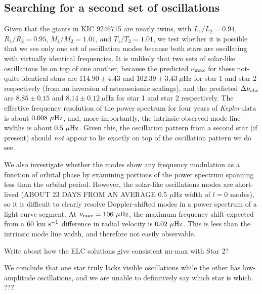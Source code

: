 \subsection{Searching for a second set of oscillations}

Given that the giants in KIC 9246715 are nearly twins, with $L_1/L_2 = 0.94$, $R_1/R_2 = 0.95$, $M_1/M_2 = 1.01$, and $T_1/T_2 = 1.01$, we test whether it is possible that we see only one set of oscillation modes because both stars are oscillating with virtually identical frequencies. It is unlikely that two sets of solar-like oscillations lie on top of one another, because the predicted $\nu_{\rm{max}}$ for these not-quite-identical stars are $114.90 \pm 4.43$ and $102.39 \pm 3.43\ \mu$Hz for star 1 and star 2 respectively (from an inversion of asteroseismic scalings), and the predicted $\Delta\nu_{\rm{obs}}$ are $8.85 \pm 0.15$ and $8.14 \pm 0.12 \ \mu$Hz for star 1 and star 2 respectively. The effective frequency resolution of the power spectrum for four years of \emph{Kepler} data is about $0.008 \ \mu \rm{Hz}$, and, more importantly, the intrinsic observed mode line widths is about $0.5 \ \mu \rm{Hz}$.
Given this, the oscillation pattern from a second star (if present) should \emph{not} appear to lie exactly on top of the oscillation pattern we do see. 

We also investigate whether the modes show any frequency modulation as a function of orbital phase by examining portions of the power spectrum spanning less than the orbital period. However, the solar-like oscillations modes are short-lived (ABOUT 23 DAYS FROM AN AVERAGE 0.5 $\mu$Hz width of $l=0$ modes), so it is difficult to clearly resolve Doppler-shifted modes in a power spectrum of a light curve segment. At $\nu_{\rm{max}} = 106 \ \mu \rm{Hz}$, the maximum frequency shift expected from a $60 \ \rm{km} \ \rm{s}^{-1}$ difference in radial velocity is $0.02 \ \mu \rm{Hz}$. This is less than the intrinsic mode line width, and therefore not easily observable.

Write about how the ELC solutions give consistent nu-max with Star 2?

We conclude that one star truly lacks visible oscillations while the other has low-amplitude oscillations, and we are unable to definitively say which star is which. ???
    
    
    
    
    
    
  
  
  
  
  
  
  
  
  
  